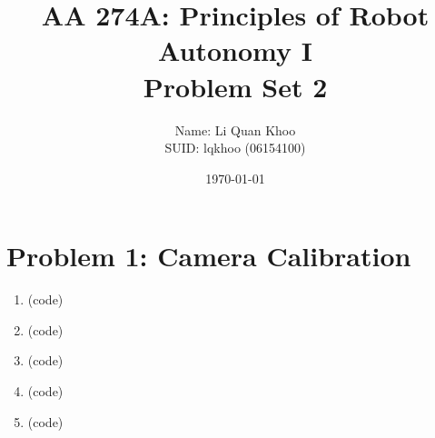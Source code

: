 \documentclass{article}
\title{AA 274A: Principles of Robot Autonomy I \\ Problem Set 2}
\author{Name: Li Quan Khoo     \\ SUID: lqkhoo (06154100)}
\date{\today}
\begin{document}
\maketitle
\pagestyle{fancy} 

\section*{Problem 1: Camera Calibration}
\begin{enumerate}[label=(\roman*)]
\item %
(code)

\item %
(code)

\item %
(code)

\item %
(code)

\item %
(code)

\end{enumerate}
\end{document}

